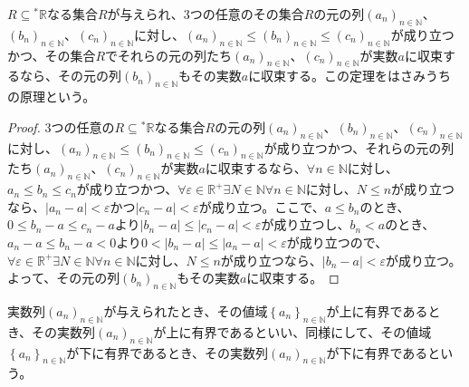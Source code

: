 \documentclass[dvipdfmx]{jsarticle}
\begin{document}
\begin{thm}[はさみうちの原理]\label{4.1.4.14}
$R \subseteq{}^{*}\mathbb{R}$なる集合$R$が与えられ、3つの任意のその集合$R$の元の列$\left( a_{n} \right)_{n \in \mathbb{N}}$、$\left( b_{n} \right)_{n \in \mathbb{N}}$、$\left( c_{n} \right)_{n \in \mathbb{N}}$に対し、$\left( a_{n} \right)_{n \in \mathbb{N}} \leq \left( b_{n} \right)_{n \in \mathbb{N}} \leq \left( c_{n} \right)_{n \in \mathbb{N}}$が成り立つかつ、その集合$R$でそれらの元の列たち$\left( a_{n} \right)_{n \in \mathbb{N}}$、$\left( c_{n} \right)_{n \in \mathbb{N}}$が実数$a$に収束するなら、その元の列$\left( b_{n} \right)_{n \in \mathbb{N}}$もその実数$a$に収束する。この定理をはさみうちの原理という。
\end{thm}
\begin{proof}
3つの任意の$R \subseteq{}^{*}\mathbb{R}$なる集合$R$の元の列$\left( a_{n} \right)_{n \in \mathbb{N}}$、$\left( b_{n} \right)_{n \in \mathbb{N}}$、$\left( c_{n} \right)_{n \in \mathbb{N}}$に対し、$\left( a_{n} \right)_{n \in \mathbb{N}} \leq \left( b_{n} \right)_{n \in \mathbb{N}} \leq \left( c_{n} \right)_{n \in \mathbb{N}}$が成り立つかつ、それらの元の列たち$\left( a_{n} \right)_{n \in \mathbb{N}}$、$\left( c_{n} \right)_{n \in \mathbb{N}}$が実数$a$に収束するなら、$\forall n \in \mathbb{N}$に対し、$a_{n} \leq b_{n} \leq c_{n}$が成り立つかつ、$\forall\varepsilon \in \mathbb{R}^{+}\exists N \in \mathbb{N}\forall n \in \mathbb{N}$に対し、$N \leq n$が成り立つなら、$\left| a_{n} - a \right| < \varepsilon$かつ$\left| c_{n} - a \right| < \varepsilon$が成り立つ。ここで、$a \leq b_{n}$のとき、$0 \leq b_{n} - a \leq c_{n} - a$より$\left| b_{n} - a \right| \leq \left| c_{n} - a \right| < \varepsilon$が成り立つし、$b_{n} < a$のとき、$a_{n} - a \leq b_{n} - a < 0$より$0 < \left| b_{n} - a \right| \leq \left| a_{n} - a \right| < \varepsilon$が成り立つので、$\forall\varepsilon \in \mathbb{R}^{+}\exists N \in \mathbb{N}\forall n \in \mathbb{N}$に対し、$N \leq n$が成り立つなら、$\left| b_{n} - a \right| < \varepsilon$が成り立つ。よって、その元の列$\left( b_{n} \right)_{n \in \mathbb{N}}$もその実数$a$に収束する。
\end{proof}
\begin{dfn}
実数列$\left( a_{n} \right)_{n \in \mathbb{N}}$が与えられたとき、その値域$\left\{ a_{n} \right\}_{n \in \mathbb{N}}$が上に有界であるとき、その実数列$\left( a_{n} \right)_{n \in \mathbb{N}}$が上に有界であるといい、同様にして、その値域$\left\{ a_{n} \right\}_{n \in \mathbb{N}}$が下に有界であるとき、その実数列$\left( a_{n} \right)_{n \in \mathbb{N}}$が下に有界であるという。
\end{dfn}
\end{document}
